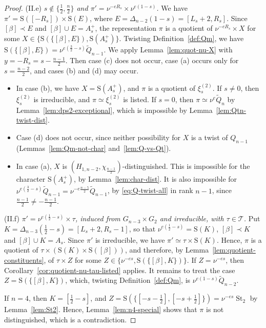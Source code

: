 \documentclass[11pt]{amsart}
\numberwithin{equation}{section}
\theoremstyle{plain}
\theoremstyle{definition}
\theoremstyle{remark}
\newcommand{\T}{\mathcal{T}}
\DeclareMathOperator{\St}{St}
\newcommand{\Qt}{\widetilde{Q}}
\newcommand{\xitwo}{\xi^{(2)}}
\newcommand{\Ss}{\mathrm{S}}
\begin{document}
\begin{proof}
	(II.e) \emph{$s\notin\{\frac12,\frac n2\}$ and $\pi'=\nu^{-eR_s}\times\nu^{e(1-s)}$.} We have $\pi'=\Ss([-R_s])\times\Ss(E)$, where $E=\Delta_{n-2}(1-s)=[L_s+2,R_s]$. Since $[\beta]\prec E$ and $[\beta]\cup E=A_s^+$, the representation $\pi$ is a quotient of $\nu^{-eR_s}\times X$ for some $X\in\{\Ss(\{[\beta],E\}),\Ss(A_s^+)\}$. Twisting Definition~\ref{def:Qm}, we have $\Ss(\{[\beta],E\})=\nu^{e(\frac32-s)}\Qt_{n-1}$. We apply Lemma~\ref{lem:quot-nu-X} with $y=-R_s=s-\frac{n-1}2$. Then case (c) does not occur, case (a) occurs only for $s=\frac{n-2}2$, and cases (b) and (d) may occur.
	\begin{itemize}
		\item In case (b), we have $X=\Ss(A_s^+)$, and $\pi$ is a quotient of $\xitwo_s$. If $s\ne0$, then $\xitwo_s$ is irreducible, and $\pi\simeq\xitwo_s$ is listed. If $s=0$, then $\pi\simeq\nu^e\Qt_n$ by Lemma~\ref{lem:dps2-exceptional}, which is impossible by Lemma~\ref{lem:Qtn-twist-dist}.
		\item Case (d) does not occur, since neither possibility for $X$ is a twist of $Q_{n-1}$ (Lemmas~\ref{lem:Qm-not-char} and~\ref{lem:Q-vs-Qt}).
		\item In case (a), $X$ is $(H_{1,n-2},\chi_{\frac{n-1}2})$-distinguished. This is impossible for the character $\Ss(A_s^+)$, by Lemma~\ref{lem:char-dist}. It is also impossible for $\nu^{e(\frac32-s)}\Qt_{n-1}=\nu^{-e\frac{n-5}2}\Qt_{n-1}$, by \eqref{eq:Q-twist-all} in rank $n-1$, since $\frac{n-1}2\ne-\frac{n-1}2$.
	\end{itemize}
	
	(II.f) \emph{$\pi'=\nu^{e(\frac12-s)}\times\tau$, induced from $G_{n-3}\times G_2$ and irreducible, with $\tau\in\T$.} Put $K=\Delta_{n-3}(\frac12-s)=[L_s+2,R_s-1]$, so that $\nu^{e(\frac12-s)}=\Ss(K)$, $[\beta]\prec K$ and $[\beta]\cup K=A_s$. Since $\pi'$ is irreducible, we have $\pi'\simeq\tau\times\Ss(K)$. Hence, $\pi$ is a quotient of $\tau\times(\Ss(K)\times\Ss([\beta]))$, and therefore, by Lemma~\ref{lem:quotient-constituents}, of $\tau\times Z$ for some $Z\in\{\nu^{-es},\Ss(\{[\beta],K\})\}$. If $Z=\nu^{-es}$, then Corollary~\ref{cor:quotient-nu-tau-listed} applies. It remains to treat the case $Z=\Ss(\{[\beta],K\})$, which, twisting Definition~\ref{def:Qm}, is $\nu^{e(1-s)}\Qt_{n-2}$.
	
	If $n=4$, then $K=[\frac12-s]$, and $Z=\Ss(\{[-s-\frac12],[-s+\frac12]\})=\nu^{-es}\St_2$ by Lemma~\ref{lem:St2}. Hence, Lemma~\ref{lem:n4-special} shows that $\pi$ is not distinguished, which is a contradiction.
	

\end{proof}
\end{document}
